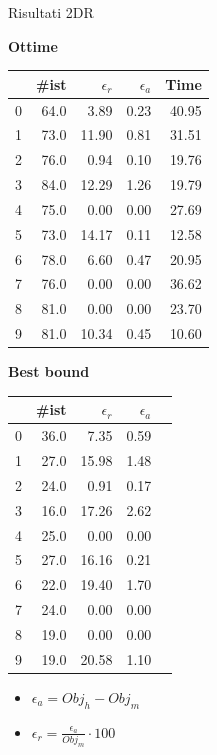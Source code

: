 \documentclass{beamer}
\begin{document}
\begin{frame}{Risultati 2DR}
	\begin{minipage}{0.49\textwidth}
		\centering
		\textbf{Ottime}
				
		\begin{tabular}{lrrrr}
			{} & \#ist & $\epsilon_r$ & $\epsilon_a$ & Time  \\
			\hline
			0  & 64.0  & 3.89         & 0.23         & 40.95 \\
			1  & 73.0  & 11.90        & 0.81         & 31.51 \\
			2  & 76.0  & 0.94         & 0.10         & 19.76 \\
			3  & 84.0  & 12.29        & 1.26         & 19.79 \\
			4  & 75.0  & 0.00         & 0.00         & 27.69 \\
			5  & 73.0  & 14.17        & 0.11         & 12.58 \\
			6  & 78.0  & 6.60         & 0.47         & 20.95 \\
			7  & 76.0  & 0.00         & 0.00         & 36.62 \\
			8  & 81.0  & 0.00         & 0.00         & 23.70 \\
			9  & 81.0  & 10.34        & 0.45         & 10.60 \\
		\end{tabular}
	\end{minipage}
	\begin{minipage}{0.49\textwidth}
		\centering
		\textbf{Best bound}
				
		\begin{tabular}{lrrrr}
			{} & \#ist & $\epsilon_r$ & $\epsilon_a$ \\
			\hline
			0  & 36.0  & 7.35         & 0.59         \\
			1  & 27.0  & 15.98        & 1.48         \\
			2  & 24.0  & 0.91         & 0.17         \\
			3  & 16.0  & 17.26        & 2.62         \\
			4  & 25.0  & 0.00         & 0.00         \\
			5  & 27.0  & 16.16        & 0.21         \\
			6  & 22.0  & 19.40        & 1.70         \\
			7  & 24.0  & 0.00         & 0.00         \\
			8  & 19.0  & 0.00         & 0.00         \\
			9  & 19.0  & 20.58        & 1.10         \\
		\end{tabular}
	\end{minipage}
	\vspace{.5em}
	\begin{itemize}
		\item $\epsilon_a = Obj_h - Obj_m$
		\item $\epsilon_r = \frac{\epsilon_a}{Obj_m} \cdot 100$
	\end{itemize}	
\end{frame}
\end{document}
